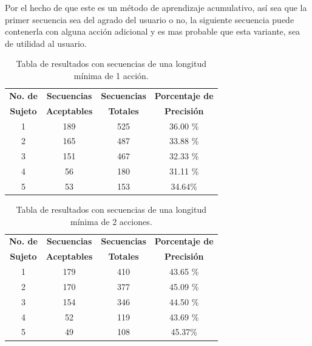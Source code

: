 Por el hecho de que este es un m\'etodo de aprendizaje acumulativo, as\'i sea
 que la primer secuencia sea del agrado del usuario o no, la siguiente 
 secuencia puede contenerla con alguna acci\'on adicional y es mas 
 probable que esta variante, sea de utilidad al usuario. 

 
\begin{table}[]
\centering
\begin{tabular}{cccc}
\hline
\textbf{No. de }	
&	\textbf{Secuencias }	
&   \textbf{Secuencias }	
&	\textbf{Porcentaje de }	\\

\textbf{Sujeto}
&	\textbf{Aceptables}
&	\textbf{Totales}
&	\textbf{Precisi\'on}
	\\ \hline

1				
&	189						
&	525						
&	36.00 \%		\\

2				
&	165						
&	487						
&	33.88 \%		\\

3
&	151
&	467
&	32.33 \%		\\

4
&	56
&	180
&	31.11 \%		\\

5
&	53
&	153
&	34.64\%			\\
\hline
\end{tabular}
\caption{Tabla de resultados con secuencias de una longitud m\'inima de 
 1 acci\'on.}
\label{tableRes1}
\end{table}


\begin{table}[]
\centering
\begin{tabular}{cccc}
\hline
\textbf{No. de }	
&	\textbf{Secuencias }	
&   \textbf{Secuencias }	
&	\textbf{Porcentaje de }	\\

\textbf{Sujeto}
&	\textbf{Aceptables}
&	\textbf{Totales}
&	\textbf{Precisi\'on}
	\\ \hline

1
&	179
&	410
&	43.65 \%		\\
	
2
&	170
&	377
&	45.09 \%		\\

3
&	154
&	346
&	44.50 \%		\\

4
&	52
&	119
&	43.69 \%		\\

5
&	49
&	108
&	45.37\%			\\
\hline
\end{tabular}
\caption{Tabla de resultados con secuencias de una longitud m\'inima de 
 2 acciones.}
\label{tableRes2}
\end{table}

